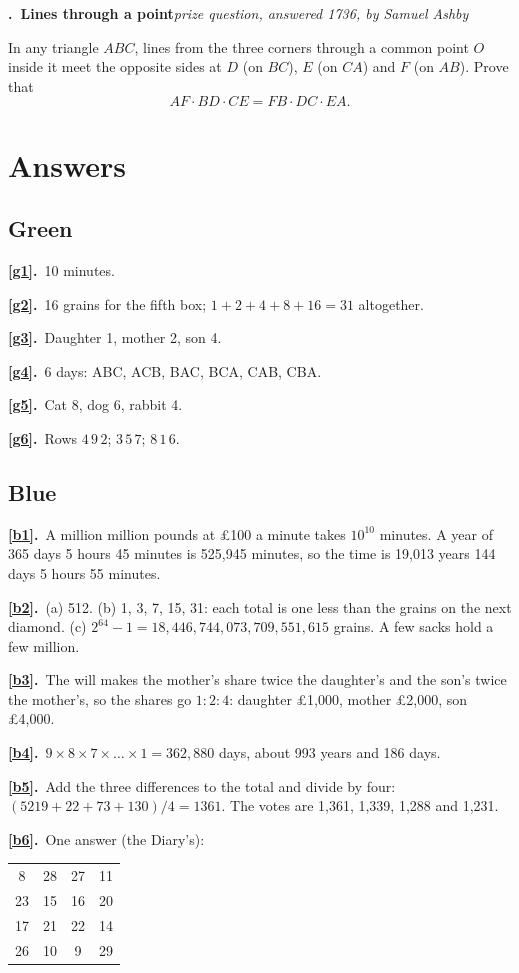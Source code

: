 \documentclass[11pt,a4paper]{article}
\newcounter{prob}
\newcommand{\prob}[3]{\par\bigskip\refstepcounter{prob}\label{#1}%
  \noindent\textbf{\theprob.\ #2}\hfill{\small\textit{#3}}\par\nopagebreak\smallskip}
\newcommand{\ans}[2]{\par\smallskip\noindent\textbf{\ref{#1}.}\ #2}
\begin{document}
\prob{u-ceva}{Lines through a point}{prize question, answered 1736, by Samuel Ashby}
In any triangle $ABC$, lines from the three corners through a common point $O$ inside it
meet the opposite sides at $D$ (on $BC$), $E$ (on $CA$) and $F$ (on $AB$). Prove that
\[AF\cdot BD\cdot CE = FB\cdot DC\cdot EA.\]
\begin{center}
\end{center}
\clearpage
\section*{Answers}

\subsection*{\color{bandgreen}Green}
\ans{g1}{10 minutes.}
\ans{g2}{16 grains for the fifth box; $1+2+4+8+16 = 31$ altogether.}
\ans{g3}{Daughter 1, mother 2, son 4.}
\ans{g4}{6 days: ABC, ACB, BAC, BCA, CAB, CBA.}
\ans{g5}{Cat 8, dog 6, rabbit 4.}
\ans{g6}{Rows $4\,9\,2$; $3\,5\,7$; $8\,1\,6$.}

\subsection*{\color{bandblue}Blue}
\ans{b1}{A million million pounds at £100 a minute takes $10^{10}$ minutes. A year of
365 days 5 hours 45 minutes is 525,945 minutes, so the time is 19,013 years 144 days 5
hours 55 minutes.}
\ans{b2}{(a) 512. (b) 1, 3, 7, 15, 31: each total is one less than the grains on the next
diamond. (c) $2^{64}-1 = 18{,}446{,}744{,}073{,}709{,}551{,}615$ grains. A few sacks hold a
few million.}
\ans{b3}{The will makes the mother's share twice the daughter's and the son's twice the
mother's, so the shares go $1:2:4$: daughter £1,000, mother £2,000, son £4,000.}
\ans{b4}{$9\times8\times7\times\dots\times1 = 362{,}880$ days, about 993 years and 186
days.}
\ans{b5}{Add the three differences to the total and divide by four:
$(5219+22+73+130)/4 = 1361$. The votes are 1,361, 1,339, 1,288 and 1,231.}
\ans{b6}{One answer (the Diary's):
\begin{center}\begin{tabular}{cccc}
8&28&27&11\\ 23&15&16&20\\ 17&21&22&14\\ 26&10&9&29
\end{tabular}\end{center}}
\end{document}
